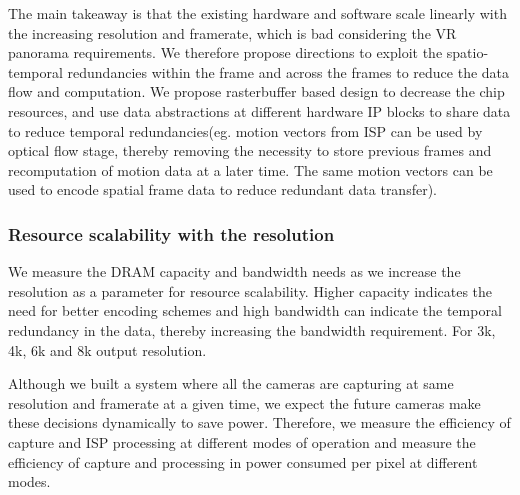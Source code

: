 The main takeaway is that the existing hardware and software scale linearly with the increasing resolution and framerate, which is bad considering the VR panorama requirements. We therefore propose directions to exploit the spatio-temporal redundancies within the frame and across the frames to reduce the data flow and computation. We propose rasterbuffer based design to decrease the chip resources, and use data abstractions at different hardware IP blocks to share data to reduce temporal redundancies(eg. motion vectors from ISP can be used by optical flow stage, thereby removing the necessity to store previous frames and recomputation of motion data at a later time. The same motion vectors can be used to encode spatial frame data to reduce redundant data transfer).

\subsubsection{Resource scalability with the resolution}
We measure the DRAM capacity and bandwidth needs as we increase the resolution as a parameter for resource scalability. Higher capacity indicates the need for better encoding schemes and high bandwidth can indicate the temporal redundancy in the data, thereby increasing the bandwidth requirement. For 3k, 4k, 6k and 8k output resolution.

Although we built a system where all the cameras are capturing at same resolution and framerate at a given time, we expect the future cameras make these decisions dynamically to save power. Therefore, we  measure the efficiency of capture and ISP processing at different modes of operation and measure the efficiency of capture and processing in power consumed per pixel at different modes.

